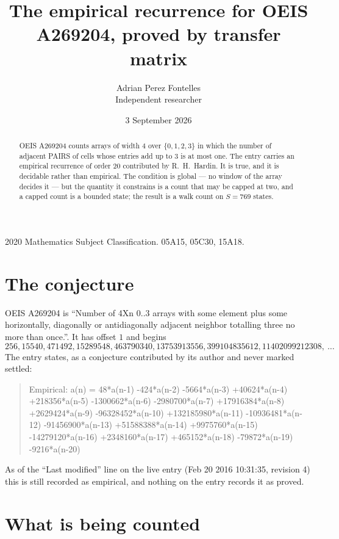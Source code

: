 \documentclass[11pt,a4paper]{article}
\title{The empirical recurrence for OEIS A269204, proved by transfer matrix}
\author{Adrian Perez Fontelles\\ \small Independent researcher}
\date{3 September 2026}
\theoremstyle{plain}
\theoremstyle{definition}
\begin{document}
\maketitle

\begin{abstract}
OEIS A269204 counts arrays of width $4$ over $\{0,1,2,3\}$ in which the number of adjacent PAIRS of
cells whose entries add up to $3$ is at most one. The entry carries an empirical recurrence of
order $20$ contributed by R.~H.~Hardin. It is true, and it is decidable rather than
empirical. The condition is global --- no window of the array decides it --- but the quantity
it constrains is a count that may be capped at two, and a capped count is a bounded state; the
result is a walk count on $S=769$ states.
\end{abstract}

\noindent\small 2020 Mathematics Subject Classification. 05A15, 05C30, 15A18.\normalsize

\section{The conjecture}

OEIS A269204 is ``Number of 4Xn 0..3 arrays with some element plus some horizontally, diagonally or antidiagonally adjacent neighbor totalling three no more than once.''. It has offset $1$ and begins
\[
256, 15540, 471492, 15289548, 463790340, 13753913556, 399104835612, 11402099212308,\ \dots
\]
The entry states, as a conjecture contributed by its author and never marked settled:
\begin{quote}
Empirical: a(n) = 48*a(n-1) -424*a(n-2) -5664*a(n-3) +40624*a(n-4) +218356*a(n-5) -1300662*a(n-6) -2980700*a(n-7) +17916384*a(n-8) +2629424*a(n-9) -96328452*a(n-10) +132185980*a(n-11) -10936481*a(n-12) -91456900*a(n-13) +51588388*a(n-14) +9975760*a(n-15) -14279120*a(n-16) +2348160*a(n-17) +465152*a(n-18) -79872*a(n-19) -9216*a(n-20)
\end{quote}
As of the ``Last modified'' line on the live entry (Feb 20 2016 10:31:35, revision 4) this is still
recorded as empirical, and nothing on the entry records it as proved.

\section{What is being counted}
\end{document}
